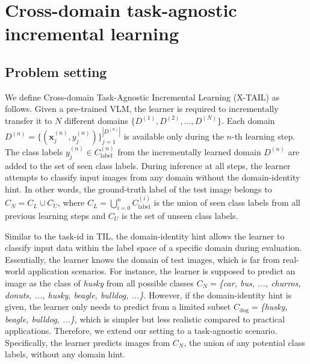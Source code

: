 \documentclass{article}
\begin{document}
\section{Cross-domain task-agnostic incremental learning}
\label{sec:background}
\subsection{Problem setting}
We define Cross-domain Task-Agnostic Incremental Learning (X-TAIL) as follows. Given a pre-trained VLM, the learner is required to incrementally transfer it to $N$ different domains $\{D^{\left(1\right)}, D^{\left(2\right)}, ..., D^{\left(N\right)}\}$. Each domain $D^{\left(n\right)} = \{(\mathbf{x}_j^{\left(n\right)}, y_j^{\left(n\right)})\}_{j=1}^{|D^{\left(n\right)}|}$ is available only during the $n$-th learning step. The class labels $y_j^{\left(n\right)} \in C_{\text{label}}^{\left(n\right)}$ from the incrementally learned domain $D^{\left(n\right)}$ are added to the set of seen class labels. During inference at all steps, the learner attempts to classify input images from any domain without the domain-identity hint. In other words, the ground-truth label of the test image belongs to $C_N = C_L \cup C_U$, where $C_L = \bigcup_{i=0}^n C_{\text{label}}^{\left(i\right)}$ is the union of seen class labels from all previous learning steps and
$C_U$ is the set of unseen class labels.

Similar to the task-id in TIL, the domain-identity hint allows the learner to classify input data within the label space of a specific domain during evaluation. Essentially, the learner knows the domain of test images, which is far from real-world application scenarios.
For instance, the learner is supposed to predict an image as the class of \textit{husky} from all possible classes $C_N=$\textit{\{car, bus, ..., churros, donuts, ..., husky, beagle, bulldog, ...\}}. However, if the domain-identity hint is given, the learner only needs to predict from a limited subset $C_{\text{dog}}=$\textit{\{husky, beagle, bulldog, ...\}}, which is simpler but less realistic compared to practical applications. Therefore, we extend our setting to a task-agnostic scenario. Specifically, the learner predicts images from $C_N$, the union of any potential class labels, without any domain hint.
\end{document}
